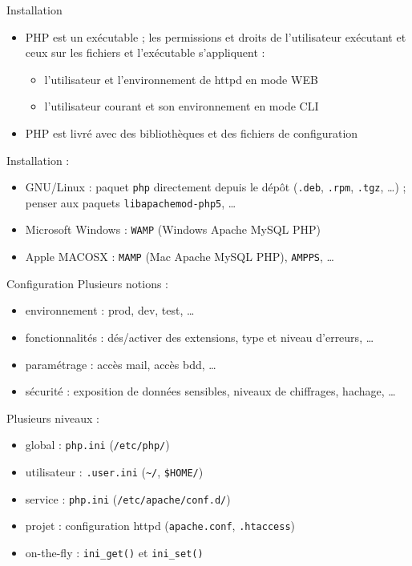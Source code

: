 \documentclass{beamer}
\begin{document}
\begin{frame}{Installation}
	\begin{itemize}
		\item PHP est un exécutable ; les permissions et droits de l'utilisateur exécutant et ceux sur les fichiers et l'exécutable s'appliquent :
			\begin{itemize}
				\item l'utilisateur et l'environnement de httpd en mode WEB
				\item l'utilisateur courant et son environnement en mode CLI
			\end{itemize}
		\item PHP est livré avec des bibliothèques et des fichiers de configuration
	\end{itemize}
	Installation :
	\begin{itemize}
		\item GNU/Linux : paquet \texttt{php} directement depuis le dépôt (\texttt{.deb}, \texttt{.rpm}, \texttt{.tgz}, \ldots) ; penser aux paquets \texttt{libapachemod-php5}, \ldots
		\item Microsoft Windows : \texttt{WAMP} (Windows Apache MySQL PHP)
		\item Apple MACOSX : \texttt{MAMP} (Mac Apache MySQL PHP), \texttt{AMPPS}, \ldots
	\end{itemize}
\end{frame}

\begin{frame}{Configuration}
	Plusieurs notions :
	\begin{itemize}
		\item environnement : prod, dev, test, \ldots
		\item fonctionnalités : dés/activer des extensions, type et niveau d'erreurs, \ldots
		\item paramétrage : accès mail, accès bdd, \ldots
		\item sécurité : exposition de données sensibles, niveaux de chiffrages, hachage, \ldots
	\end{itemize}
	Plusieurs niveaux :
	\begin{itemize}
		\item global : \texttt{php.ini} (\texttt{/etc/php/})
		\item utilisateur : \texttt{.user.ini} (\texttt{\textasciitilde/}, \texttt{\$HOME/})
		\item service : \texttt{php.ini} (\texttt{/etc/apache/conf.d/})
		\item projet : configuration httpd (\texttt{apache.conf}, \texttt{.htaccess})
		\item on-the-fly : \texttt{ini\_get()} et \texttt{ini\_set()}
	\end{itemize}
\end{frame}
\end{document}
